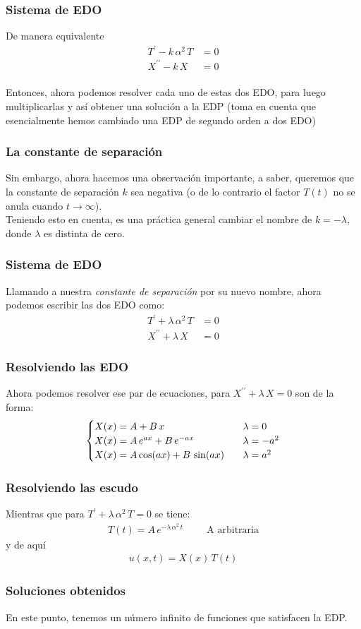 \begin{frame}
\frametitle{Sistema de EDO}
De manera equivalente
\begin{align*}
T^{\prime} - k \, \alpha^{2} \, T &= 0 \\[0.5em]
X^{\prime \prime} - k \, X &= 0
\end{align*}
\\
\bigskip
\pause
Entonces, ahora podemos resolver cada uno de estas dos EDO, para luego multiplicarlas y así obtener una solución a la EDP (toma en cuenta que esencialmente hemos cambiado una EDP de segundo orden a dos EDO)
\end{frame}
\begin{frame}
\frametitle{La constante de separación}
Sin embargo, ahora hacemos una observación importante, a saber, queremos que la constante de separación $k$ sea negativa (o de lo contrario el factor $T (t)$ no se anula cuando $t \to \infty$).
\\
\bigskip
Teniendo esto en cuenta, es una práctica general cambiar el nombre de $k = - \lambda$, donde $\lambda$ es distinta de cero.
\end{frame}
\begin{frame}
\frametitle{Sistema de EDO}
Llamando a nuestra \emph{constante de separación} por su nuevo nombre, ahora podemos escribir las dos EDO como:
\begin{align*}
T^{\prime} + \lambda \, \alpha^{2} \, T &= 0 \\[0.5em]
X^{\prime \prime} + \lambda \, X &= 0
\end{align*}
\end{frame}
\begin{frame}
\frametitle{Resolviendo las EDO}
Ahora podemos resolver ese par de ecuaciones, para $X^{\prime \prime} + \lambda \, X = 0$ son de la forma:
\begin{align}
\begin{cases}
X(x) = A + B \, x & \hspace{0.2cm} \lambda = 0 \\
X(x) = A \, e^{a x} + B \, e^{-a x} & \hspace{0.2cm} \lambda = - a^{2} \\
X(x) = A \cos (a x ) + B \, \sin (a x) & \hspace{0.2cm} \lambda = a^{2}
\end{cases}
\label{eq:ecuacion_06_02_31}
\end{align}
\end{frame}
\begin{frame}
\frametitle{Resolviendo las escudo}
Mientras que para $T^{\prime} + \lambda \, \alpha^{2} \, T = 0$ se tiene:
\begin{align}
T(t) = A \, e^{- \lambda \, \alpha^{2} \, t} \hspace{1cm} \mbox{A arbitraria}
\label{eq:ecuacion_06_02_36a}    
\end{align}
y de aquí
\begin{align*}
u(x, t) = X(x) \, T(t) 
\end{align*}
\end{frame}
\begin{frame}
\frametitle{Soluciones obtenidos}
En este punto, tenemos un número infinito de funciones que satisfacen la EDP.
\end{frame}

